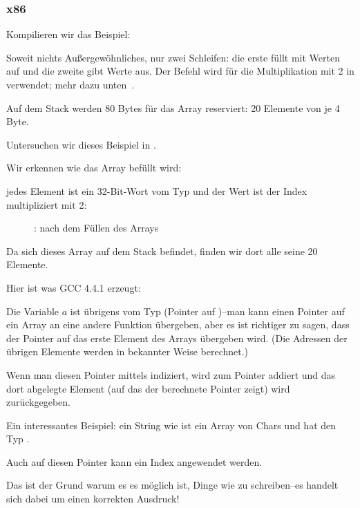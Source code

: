 \subsubsection{x86}


Kompilieren wir das Beispiel:



Soweit nichts Außergewöhnliches, nur zwei Schleifen: die erste füllt mit Werten auf und die zweite gibt Werte aus.
Der Befehl  wird für die Multiplikation mit 2 in \ECX verwendet; mehr dazu unten~.

Auf dem Stack werden 80 Bytes für das Array reserviert: 20 Elemente von je 4 Byte.

\clearpage
Untersuchen wir dieses Beispiel in \olly.
\myindex{\olly}

Wir erkennen wie das Array befüllt wird:

jedes Element ist ein 32-Bit-Wort vom Typ \Tint und der Wert ist der Index multipliziert mit 2:

\begin{figure}[H]
\centering
{}
\caption{\olly: nach dem Füllen des Arrays}
\label{fig:array_simple_olly}
\end{figure}
Da sich dieses Array auf dem Stack befindet, finden wir dort alle seine 20 Elemente.


Hier ist was GCC 4.4.1 erzeugt:


Die Variable $a$ ist übrigens vom Typ  (Pointer auf \Tint{})--man kann einen Pointer auf ein Array an eine
andere Funktion übergeben, aber es ist richtiger zu sagen, dass der Pointer auf das erste Element des Arrays übergeben
wird. (Die Adressen der übrigen Elemente werden in bekannter Weise berechnet.)

Wenn man diesen Pointer mittels  indiziert, wird  zum Pointer addiert und das dort abgelegte Element
(auf das der berechnete Pointer zeigt) wird zurückgegeben.

Ein interessantes Beispiel: ein String wie  ist ein Array von Chars und hat den Typ .

Auch auf diesen Pointer kann ein Index angewendet werden.

Das ist der Grund warum es es möglich ist, Dinge wie  zu schreiben--es handelt sich dabei um einen
korrekten \CCpp Ausdruck!

